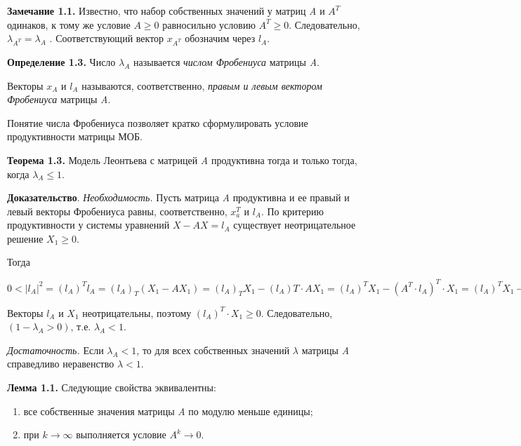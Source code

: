 \documentclass[12pt, 4paper]{book}
\begin{document}
{\textbf{Замечание 1.1.} Известно, что набор собственных значений у матриц \textit{A} и $ A^T $ одинаков, к тому же условие $ A \geq 0 $ равносильно условию $ A^T \geq 0 $. Следовательно,$ \lambda_{A^T} = \lambda_{A} $ . Соответствующий вектор $ x_{A^T} $ обозначим через $ l_A $.
\par

\textbf{Определение 1.3.} Число $ \lambda_{A}$ называется \textit{числом Фробениуса} матрицы \textit{A}.
\par

Векторы $ x_A $ и $ l_A $ называются, соответственно, \textit{правым и левым вектором Фробениуса} матрицы \textit{A}.
\par

Понятие числа Фробениуса позволяет кратко сформулировать условие продуктивности матрицы МОБ.
\par

\textbf{Теорема 1.3.} Модель Леонтьева с матрицей \textit{A} продуктивна тогда и только тогда, когда $\lambda_{A} \leq 1$.
\par

\textbf{Доказательство}. \textit{Необходимость.} 
Пусть матрица \textit{A} продуктивна и ее правый и левый векторы Фробениуса равны, соответственно, $ x_a^T $ и $ l_A $. По критерию продуктивности у системы уравнений $ X - AX = l_A $ существует неотрицательное решение $ X_1 \geq 0 $.
\par

Тогда
\begin{center}
	$0<|l_A|^2 = (l_A)^T l_A = (l_A)_T (X_1 - AX_1) = (l_A)_T X_1 - (l_A)T \cdot AX_1 = (l_A)^T X_1 - (A^T \cdot l_A)^T \cdot X_1  = (l_A)^T X_1 - (\lambda_{A} \cdot l_A)^T \cdot X_1 = (1 - \lambda_{A})(l_A)^T \cdot X_1$
\end{center}
\par

Векторы $l_A$ и $ X_1 $ неотрицательны, поэтому $ (l_A)^T \cdot X_1 \geq 0 $. Следовательно, $ (1 -\lambda_{A} > 0) $, т.е. $ \lambda_{A} < 1 $.
\par

\textit{Достаточность.} Если $ \lambda_{A} < 1 $, то для всех собственных значений $ \lambda $ матрицы \textit{A} справедливо неравенство $ \lambda < 1 $.
\par

\textbf{Лемма 1.1.} Следующие свойства эквивалентны:
\begin{enumerate}
	\item все собственные значения матрицы \textit{A} по модулю меньше единицы;
	\item при $ k \rightarrow \infty$ выполняется условие $ A^k \rightarrow 0 $.
\end{enumerate}
\par

}
\end{document}
